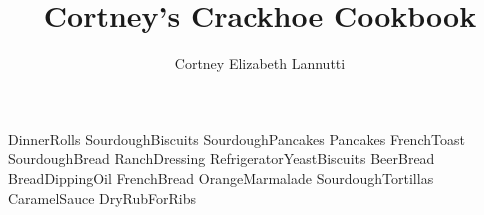 \documentclass[a4paper, titlepage]{book}
\title{Cortney's Crackhoe Cookbook}
\author{Cortney Elizabeth Lannutti}
\date{}
\begin{document}
\maketitle
{}
\tableofcontents
\newpage
{}

{DinnerRolls}
{SourdoughBiscuits}
{SourdoughPancakes}
{Pancakes}
{FrenchToast}
{SourdoughBread}
{RanchDressing}
{RefrigeratorYeastBiscuits}
{BeerBread}
{BreadDippingOil}
{FrenchBread}
{OrangeMarmalade}
{SourdoughTortillas}
{CaramelSauce}
{DryRubForRibs}
\end{document}
